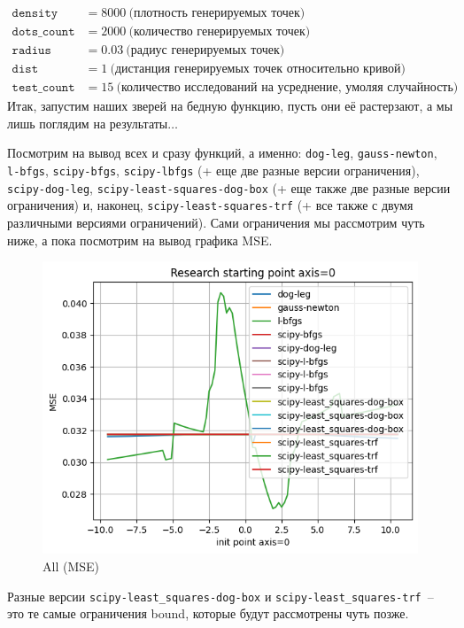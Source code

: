 \documentclass[12pt, a4paper, oneside, final]{article}
\begin{document}
	\begin{align*}
		\mathtt{density} &= 8000~\text{(плотность генерируемых точек)} \\
		\mathtt{dots\_count} &= 2000~\text{(количество генерируемых точек)} \\
		\mathtt{radius} &= 0.03~\text{(радиус генерируемых точек)} \\
		\mathtt{dist} &= 1~\text{(дистанция генерируемых точек относительно кривой)} \\
		\mathtt{test\_count} &= 15~\text{(количество исследований на усреднение, умоляя случайность)}
	\end{align*}
	Итак, запустим наших зверей на бедную функцию, пусть они её растерзают, а мы лишь поглядим на результаты$\ldots$

	Посмотрим на вывод всех и сразу функций, а именно: \texttt{dog-leg}, \texttt{gauss-newton}, \texttt{l-bfgs}, \texttt{scipy-bfgs}, \texttt{scipy-lbfgs} (+ еще две разные версии ограничения), \texttt{scipy-dog-leg}, \texttt{scipy-least-squares-dog-box} (+ еще также две разные версии ограничения) и, наконец, \texttt{scipy-least-squares-trf} (+ все также с двумя различными версиями ограничений).
	Сами ограничения мы рассмотрим чуть ниже, а пока посмотрим на вывод графика MSE.
	\begin{figure}[H]
		\centering
		\includegraphics[scale = 1]{Image/T2A_LEAST_ALL_MSE.png}
		\caption*{All (MSE)}
	\end{figure}
	Разные версии \texttt{scipy-least\_squares-dog-box} и \texttt{scipy-least\_squares-trf}~-- это те самые ограничения bound, которые будут рассмотрены чуть позже.
\end{document}
